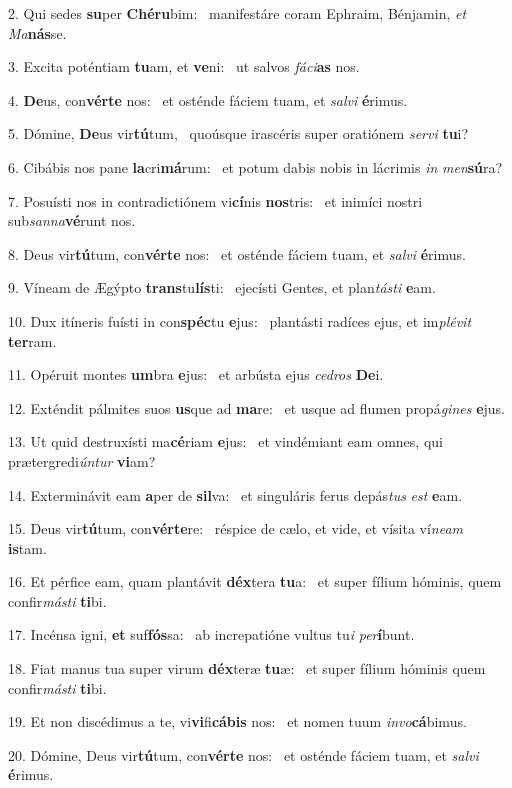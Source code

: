 2. Qui sedes \textbf{su}per \textbf{Ché}\textbf{ru}bim: \ast\  manifestáre coram Ephraim, Bénjamin, \textit{et} \textit{Ma}\textbf{nás}se.\

3. Excita poténtiam \textbf{tu}am, et \textbf{ve}ni: \ast\  ut salvos \textit{fá}\textit{ci}\textbf{as} nos.\

4. \textbf{De}us, con\textbf{vér}\textbf{te} nos: \ast\  et osténde fáciem tuam, et \textit{sal}\textit{vi} \textbf{é}rimus.\

5. Dómine, \textbf{De}us vir\textbf{tú}tum, \ast\  quoúsque irascéris super oratiónem \textit{ser}\textit{vi} \textbf{tu}i?\

6. Cibábis nos pane \textbf{la}cri\textbf{má}rum: \ast\  et potum dabis nobis in lácrimis \textit{in} \textit{men}\textbf{sú}ra?\

7. Posuísti nos in contradictiónem vi\textbf{cí}nis \textbf{nos}tris: \ast\  et inimíci nostri sub\textit{san}\textit{na}\textbf{vé}runt nos.\

8. Deus vir\textbf{tú}tum, con\textbf{vér}\textbf{te} nos: \ast\  et osténde fáciem tuam, et \textit{sal}\textit{vi} \textbf{é}rimus.\

9. Víneam de Ægýpto \textbf{trans}tu\textbf{lís}ti: \ast\  ejecísti Gentes, et plan\textit{tás}\textit{ti} \textbf{e}am.\

10. Dux itíneris fuísti in con\textbf{spéc}tu \textbf{e}jus: \ast\  plantásti radíces ejus, et im\textit{plé}\textit{vit} \textbf{ter}ram.\

11. Opéruit montes \textbf{um}bra \textbf{e}jus: \ast\  et arbústa ejus \textit{ce}\textit{dros} \textbf{De}i.\

12. Exténdit pálmites suos \textbf{us}que ad \textbf{ma}re: \ast\  et usque ad flumen propá\textit{gi}\textit{nes} \textbf{e}jus.\

13. Ut quid destruxísti ma\textbf{cé}riam \textbf{e}jus: \ast\  et vindémiant eam omnes, qui prætergredi\textit{ún}\textit{tur} \textbf{vi}am?\

14. Exterminávit eam \textbf{a}per de \textbf{sil}va: \ast\  et singuláris ferus depás\textit{tus} \textit{est} \textbf{e}am.\

15. Deus vir\textbf{tú}tum, con\textbf{vér}\textbf{te}re: \ast\  réspice de cælo, et vide, et vísita ví\textit{ne}\textit{am} \textbf{is}tam.\

16. Et pérfice eam, quam plantávit \textbf{déx}tera \textbf{tu}a: \ast\  et super fílium hóminis, quem confir\textit{más}\textit{ti} \textbf{ti}bi.\

17. Incénsa igni, \textbf{et} suf\textbf{fós}sa: \ast\  ab increpatióne vultus tu\textit{i} \textit{per}\textbf{í}bunt.\

18. Fiat manus tua super virum \textbf{déx}teræ \textbf{tu}æ: \ast\  et super fílium hóminis quem confir\textit{más}\textit{ti} \textbf{ti}bi.\

19. Et non discédimus a te, vi\textbf{vi}fi\textbf{cá}\textbf{bis} nos: \ast\  et nomen tuum \textit{in}\textit{vo}\textbf{cá}bimus.\

20. Dómine, Deus vir\textbf{tú}tum, con\textbf{vér}\textbf{te} nos: \ast\  et osténde fáciem tuam, et \textit{sal}\textit{vi} \textbf{é}rimus.\

